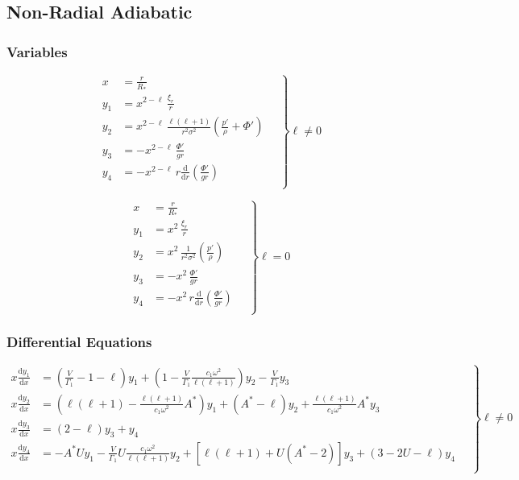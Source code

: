 \documentclass[fleqn]{article}
\newcommand{\diff}{\ensuremath{\mathrm{d}}}
\newcommand{\Vg}{\ensuremath{\frac{V}{\Gamma_{1}}}}
\newcommand{\As}{\ensuremath{A^{\ast}}}
\newcommand{\Rstar}{\ensuremath{R_{\ast}}}
\begin{document}

\newpage

\subsection*{Non-Radial Adiabatic}

\subsubsection*{Variables}

\begin{equation*}
\left.
\begin{aligned}
x     &= \frac{r}{\Rstar} \\
y_{1} &= x^{2-\ell}\, \frac{\xi_{r}}{r} \\
y_{2} &= x^{2-\ell}\, \frac{\ell(\ell+1)}{r^{2} \sigma^{2}} \left( \frac{p'}{\rho} + \Phi' \right) \\
y_{3} &= - x^{2-\ell}\, \frac{\Phi'}{gr} \\
y_{4} &= - x^{2-\ell}\, r \frac{\diff}{\diff r} \left( \frac{\Phi'}{g r} \right) \\
\end{aligned}
\quad \right\} \ell \neq 0
\end{equation*}

\begin{equation*}
\left.
\begin{aligned}
x     &= \frac{r}{\Rstar} \\
y_{1} &= x^{2}\, \frac{\xi_{r}}{r} \\
y_{2} &= x^{2}\, \frac{1}{r^{2} \sigma^{2}} \left( \frac{p'}{\rho} \right) \\
y_{3} &= - x^{2}\, \frac{\Phi'}{gr} \\
y_{4} &= - x^{2}\, r \frac{\diff}{\diff r} \left( \frac{\Phi'}{g r} \right) \\
\end{aligned}
\quad \right\} \ell = 0
\end{equation*}

\subsubsection*{Differential Equations}

\begin{equation*}
\left.
\begin{aligned}
x \frac{\diff y_{1}}{\diff x} &=
\left(\Vg - 1 - \ell \right) y_{1} +
\left(1 - \Vg \frac{c_{1} \omega^{2}}{\ell(\ell+1)} \right) y_{2} -
\Vg y_{3} \\
x \frac{\diff y_{2}}{\diff x} &=
\left( \ell(\ell+1) - \frac{\ell(\ell+1)}{c_{1} \omega^{2}} \As \right) y_{1} +
(\As - \ell) y_{2} +
\frac{\ell(\ell+1)}{c_{1} \omega^{2}} \As y_{3} \\
x \frac{\diff y_{3}}{\diff x} &=
(2 - \ell) y_{3} + y_{4} \\
x \frac{\diff y_{4}}{\diff x} &=
- \As U y_{1} 
- \Vg U \frac{c_{1} \omega^{2}}{\ell(\ell+1)} y_{2} +
\left[ \ell(\ell+1) + U(\As - 2) \right] y_{3} +
( 3 - 2U - \ell ) y_{4} \\
\end{aligned}
\quad \right\} \ell \neq 0
\end{equation*}
\end{document}
